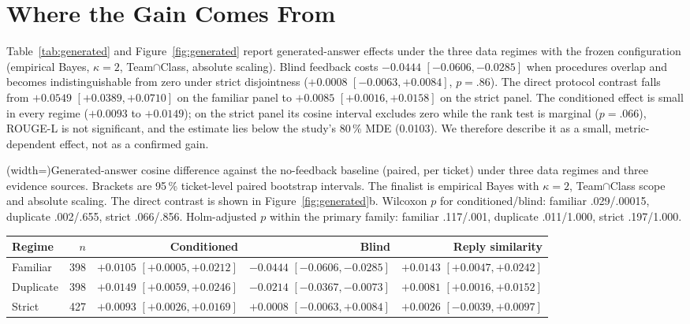 \section{Where the Gain Comes From}
\label{sec:regime}

Table~\ref{tab:generated} and Figure~\ref{fig:generated} report generated-answer
effects under the three data regimes with the frozen configuration (empirical Bayes,
$\kappa=2$, Team$\cap$Class, absolute scaling). Blind feedback costs $-0.0444$
$[-0.0606,-0.0285]$ when procedures overlap and becomes indistinguishable from zero
under strict disjointness ($+0.0008$ $[-0.0063,+0.0084]$, $p=.86$). The direct
protocol contrast falls from $+0.0549$ $[+0.0389,+0.0710]$ on the familiar panel to
$+0.0085$ $[+0.0016,+0.0158]$ on the strict panel. The conditioned effect is small
in every regime ($+0.0093$ to $+0.0149$); on the strict panel its cosine interval
excludes zero while the rank test is marginal ($p=.066$), ROUGE-L is not
significant, and the estimate lies below the study's 80\,\% MDE (0.0103). We
therefore describe it as a small, metric-dependent effect, not as a confirmed gain.

\Table[!btp](width=\textwidth){Generated-answer cosine difference against the
no-feedback baseline (paired, per ticket) under three data regimes and three
evidence sources. Brackets are 95\,\% ticket-level paired bootstrap intervals. The
finalist is empirical Bayes with $\kappa=2$, Team$\cap$Class scope and absolute
scaling. The direct contrast is shown in Figure~\ref{fig:generated}b. Wilcoxon $p$
for conditioned/blind: familiar .029/.00015, duplicate .002/.655, strict
.066/.856. Holm-adjusted $p$ within the primary family: familiar .117/.001,
duplicate .011/1.000, strict .197/1.000.\label{tab:generated}}{
\begin{tabular}{@{}lrrrr@{}}
\toprule
Regime & $n$ & Conditioned & Blind & Reply similarity \\
\midrule
Familiar  & 398 & $+0.0105$ $[+0.0005, +0.0212]$ & $-0.0444$ $[-0.0606, -0.0285]$ & $+0.0143$ $[+0.0047, +0.0242]$ \\
Duplicate & 398 & $+0.0149$ $[+0.0059, +0.0246]$ & $-0.0214$ $[-0.0367, -0.0073]$ & $+0.0081$ $[+0.0016, +0.0152]$ \\
Strict    & 427 & $+0.0093$ $[+0.0026, +0.0169]$ & $+0.0008$ $[-0.0063, +0.0084]$ & $+0.0026$ $[-0.0039, +0.0097]$ \\
\bottomrule
\end{tabular}}

